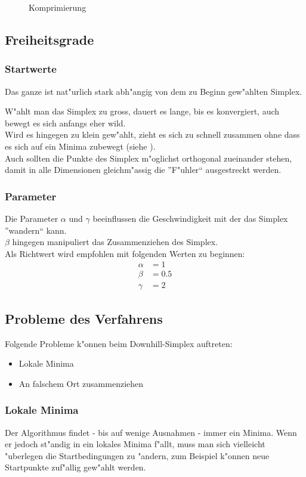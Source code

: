 \begin{figure}[h]
	\centering
  	\caption{Komprimierung}%
	\label{fig:komp}%
\end{figure}

\subsection{Freiheitsgrade}
\subsubsection{Startwerte}
Das ganze ist nat"urlich stark abh"angig von dem zu Beginn gew"ahlten Simplex.

W"ahlt man das Simplex zu gross, dauert es lange, bis es konvergiert, auch bewegt es sich anfangs eher wild.\\
Wird es hingegen zu klein gew"ahlt, zieht es sich zu schnell zusammen ohne dass es sich auf ein Minima zubewegt (siehe ).\\
Auch sollten die Punkte des Simplex m"oglichst orthogonal zueinander stehen, damit in alle Dimensionen gleichm"assig die ''F"uhler`` ausgestreckt werden.

\subsubsection{Parameter}
Die Parameter $\alpha$ und $\gamma$ beeinflussen die Geschwindigkeit mit der das Simplex ''wandern`` kann.\\
$\beta$ hingegen manipuliert das Zusammenziehen des Simplex.\\
Als Richtwert wird empfohlen mit folgenden Werten zu beginnen:
\begin{align*}
\alpha &= 1 \\
\beta &= 0.5 \\
\gamma &= 2
\end{align*}

\subsection{Probleme des Verfahrens}
Folgende Probleme k"onnen beim Downhill-Simplex auftreten:
\begin{itemize}
\item Lokale Minima
\item An falschem Ort zusammenziehen
\end{itemize}

\subsubsection{Lokale Minima}
Der Algorithmus findet - bis auf wenige Ausnahmen - immer ein Minima. Wenn er jedoch st"andig in ein lokales Minima f"allt, muss man sich vielleicht "uberlegen die Startbedingungen zu "andern, 
zum Beispiel k"onnen neue Startpunkte zuf"allig gew"ahlt werden.



